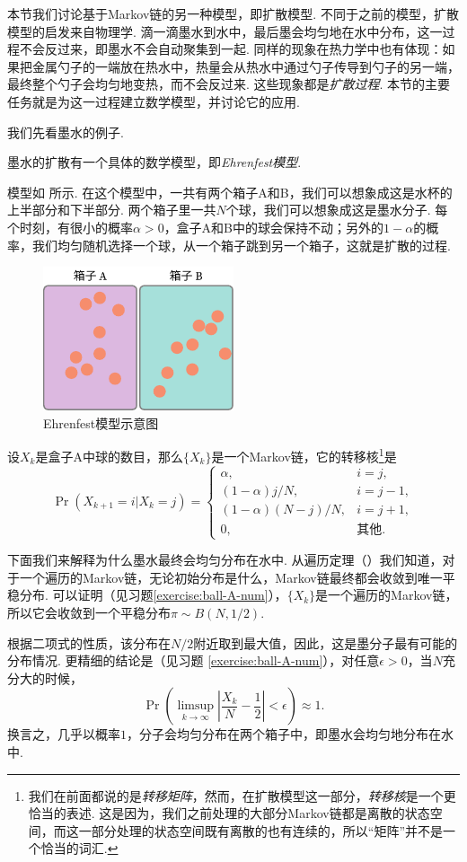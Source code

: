 本节我们讨论基于Markov链的另一种模型，即扩散模型. 不同于之前的模型，扩散模型的启发来自物理学. 滴一滴墨水到水中，最后墨会均匀地在水中分布，这一过程不会反过来，即墨水不会自动聚集到一起. 同样的现象在热力学中也有体现：如果把金属勺子的一端放在热水中，热量会从热水中通过勺子传导到勺子的另一端，最终整个勺子会均匀地变热，而不会反过来. 这些现象都是\textit{扩散过程}. 本节的主要任务就是为这一过程建立数学模型，并讨论它的应用. 

我们先看墨水的例子. 
\begin{example}[墨水的扩散]\label{ex:ink-diffusion}
墨水的扩散有一个具体的数学模型，即\textit{Ehrenfest模型}. 

模型如 所示. 在这个模型中，一共有两个箱子A和B，我们可以想象成这是水杯的上半部分和下半部分. 两个箱子里一共$N$个球，我们可以想象成这是墨水分子. 每个时刻，有很小的概率$\alpha>0$，盒子A和B中的球会保持不动；另外的$1-\alpha$的概率，我们均匀随机选择一个球，从一个箱子跳到另一个箱子，这就是扩散的过程. 

\begin{figure}[ht]
    \centering
    \includegraphics[width=0.5\textwidth]{figures/Markov-chain/Ehrenfest-model.pdf}
    \caption{Ehrenfest模型示意图}\label{fig:ehrenfest-model}
\end{figure}

设$X_k$是盒子A中球的数目，那么$\{X_k\}$是一个Markov链，它的转移核\footnote{我们在前面都说的是\textit{转移矩阵}，然而，在扩散模型这一部分，\textit{转移核}是一个更恰当的表述. 这是因为，我们之前处理的大部分Markov链都是离散的状态空间，而这一部分处理的状态空间既有离散的也有连续的，所以“矩阵”并不是一个恰当的词汇. }是
\[
    \Pr(X_{k+1}=i|X_k=j) = \begin{cases}
        \alpha, & i = j,\\
        (1-\alpha)j/N, & i = j-1,\\
        (1-\alpha)(N-j)/N, & i = j+1,\\
        0, & \text{其他}.
    \end{cases}
\]

下面我们来解释为什么墨水最终会均匀分布在水中. 从遍历定理（）我们知道，对于一个遍历的Markov链，无论初始分布是什么，Markov链最终都会收敛到唯一平稳分布. 可以证明（见习题\ref{exercise:ball-A-num}），$\{X_k\}$是一个遍历的Markov链，所以它会收敛到一个平稳分布$\pi\sim B(N,1/2)$. 

根据二项式的性质，该分布在$N/2$附近取到最大值，因此，这是墨分子最有可能的分布情况. 更精细的结论是（见习题 \ref{exercise:ball-A-num}），对任意$\epsilon>0$，当$N$充分大的时候，
\[
    \Pr\left(\limsup_{k\to\infty}\left|\frac{X_k}{N}-\frac{1}{2}\right|<\epsilon\right) \approx 1.
\]
换言之，几乎以概率$1$，分子会均匀分布在两个箱子中，即墨水会均匀地分布在水中.
\end{example}

